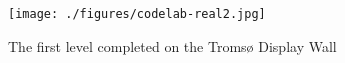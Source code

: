\documentclass[12pt,journal,compsoc]{IEEEtran}
\begin{document}
\begin{figure}[htb]
    \begin{centering}
    \texttt{[image: ./figures/codelab-real2.jpg]}
    \caption{The first level completed on the Tromsø Display Wall} 
    \label{fig:real1}
    \end{centering} 
\end{figure}


{}

\end{document}
